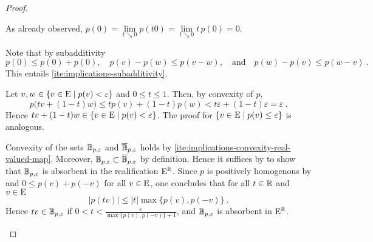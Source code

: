  \begin{proof}
   \begin{adromanlist}
   \item
     As already observed, $p(0)=\lim\limits_{t\searrow 0} p(t0) = \lim\limits_{t\searrow 0} t\, p(0) = 0$.
   \item
    Note that by subadditivity
     \[
       p(0)\leq p(0) + p(0), \quad  p(v) -p(w) \leq p(v-w), \quad \text{and} \quad
       p(w) -p(v) \leq p(w-v) \ .
     \]
     This entails \ref{ite:implications-subadditivity}. 
   \item
     Let $v,w\in \{v\in \mathrm{E}\mid p(v) < \varepsilon\}$ and $0\leq t \leq 1$. Then, by convexity of $p$,
     \[
         p\big(tv + (1-t)w\big) \leq t p(v) + (1-t) p(w)< t\varepsilon + (1-t) \varepsilon = \varepsilon \ .
     \]
     Hence $tv + (1-t)w\in  \{v\in \mathrm{E}\mid p(v) < \varepsilon\} $.
     The proof for $\{v\in \mathrm{E}\mid p(v) \leq \varepsilon\}$ is analogous.
   \item
     Convexity of the sets $\mathbb{B}_{p,\varepsilon}$ and  $\overline{\mathbb{B}}_{p,\varepsilon}$ holds by
     \ref{ite:implications-convexity-real-valued-map}.
     Moreover, $\mathbb{B}_{p,\varepsilon} \subset \overline{\mathbb{B}}_{p,\varepsilon}$ by definition.
     Hence it suffices  by 
     to show that $\mathbb{B}_{p,\varepsilon} $ is absorbent in the realification $\mathrm{E}^{\mathbb{R}}$. 
     Since $p$ is positively homogenous by  and
     $0\leq p(v) + p(-v)$ for all $v\in \mathrm{E}$, one concludes that for all $t\in\mathbb{R}$ and $v\in \mathrm{E}$
     \[
        |p(tv) | \leq |t|\max\{ p(v),p(-v) \} \ . 
     \]
     Hence $tv\in \mathbb{B}_{p,\varepsilon}$ if $0 < t < \frac{\varepsilon}{\max\{ p(v),p(-v) \} +1}$,
     and $\mathbb{B}_{p,\varepsilon}$ is absorbent in $\mathrm{E}^{\mathbb{R}}$.
   \end{adromanlist}
 \end{proof}

